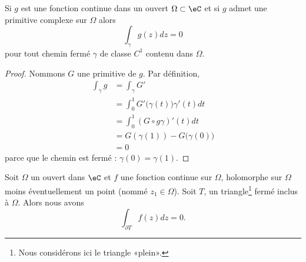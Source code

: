 \begin{lemma}       \label{LemtpEOmi}
    Si \( g\) est une fonction continue dans un ouvert \( \Omega\subset \eC\) et si \( g\) admet une primitive complexe sur \( \Omega\) alors 
    \begin{equation}
        \int_{\gamma}g(z)dz=0
    \end{equation}
    pour tout chemin fermé \( \gamma\) de classe \( C^1\) contenu dans \( \Omega\).
\end{lemma}

\begin{proof}
    Nommons \( G\) une primitive de \( g\). Par définition,
    \begin{subequations}
        \begin{align}
            \int_{\gamma}g&=\int_{\gamma}G'\\
            &=\int_0^1G'\big( \gamma(t) \big)\gamma'(t)dt\\
            &=\int_0^1 (G\circ g\gamma)'(t)dt\\
            &=G(\gamma(1))-G\big( \gamma(0) \big)\\
            &=0
        \end{align}
    \end{subequations}
    parce que le chemin est fermé : \( \gamma(0)=\gamma(1)\).
\end{proof}

\begin{lemma}  \label{LemwbwbUR}
    Soit \( \Omega\) un ouvert dans \( \eC\) et \( f\) une fonction continue sur \( \Omega\), holomorphe sur \( \Omega\) moins éventuellement un point (nommé \( z_1\in\Omega\)). Soit \( T\), un triangle\footnote{Nous considérons ici le triangle «plein».} fermé inclus à \( \Omega\). Alors nous avons
    \begin{equation}
        \int_{\partial T}f(z)dz=0.
    \end{equation}
\end{lemma}

